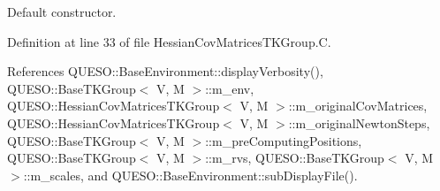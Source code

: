 Default constructor. 



Definition at line 33 of file Hessian\-Cov\-Matrices\-T\-K\-Group.\-C.



References Q\-U\-E\-S\-O\-::\-Base\-Environment\-::display\-Verbosity(), Q\-U\-E\-S\-O\-::\-Base\-T\-K\-Group$<$ V, M $>$\-::m\-\_\-env, Q\-U\-E\-S\-O\-::\-Hessian\-Cov\-Matrices\-T\-K\-Group$<$ V, M $>$\-::m\-\_\-original\-Cov\-Matrices, Q\-U\-E\-S\-O\-::\-Hessian\-Cov\-Matrices\-T\-K\-Group$<$ V, M $>$\-::m\-\_\-original\-Newton\-Steps, Q\-U\-E\-S\-O\-::\-Base\-T\-K\-Group$<$ V, M $>$\-::m\-\_\-pre\-Computing\-Positions, Q\-U\-E\-S\-O\-::\-Base\-T\-K\-Group$<$ V, M $>$\-::m\-\_\-rvs, Q\-U\-E\-S\-O\-::\-Base\-T\-K\-Group$<$ V, M $>$\-::m\-\_\-scales, and Q\-U\-E\-S\-O\-::\-Base\-Environment\-::sub\-Display\-File().


